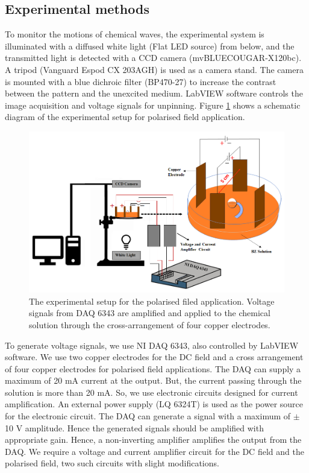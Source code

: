 \documentclass[journal=jacsat,manuscript=article]{achemso}
\begin{document}
\subsection{Experimental methods}
To monitor the motions of chemical waves, the experimental system is
illuminated with a diffused white light (Flat LED source) from below,
and the transmitted light is detected with a CCD camera
(mvBLUECOUGAR-X120bc). A tripod (Vanguard Espod CX 203AGH) is used as
a camera stand. The camera is mounted with a blue dichroic filter
(BP470-27) to increase the contrast between the pattern and the
unexcited medium.  LabVIEW software controls the image acquisition and
voltage signals for unpinning. Figure \ref{fig:ex1} shows a schematic
diagram of the experimental setup for polarised field application.
\begin{figure}[H]
    \centering
    \includegraphics[width=\linewidth]{experiment_setup_01.png}
    \caption{The experimental setup for the polarised filed
      application. Voltage signals from DAQ 6343 are amplified and
      applied to the chemical solution through the cross-arrangement
      of four copper electrodes. }
    \label{fig:ex1}
\end{figure}
To generate voltage signals, we use NI DAQ 6343, also controlled by
LabVIEW software.  We use two copper electrodes for the DC field and a
cross arrangement of four copper electrodes for polarised field
applications. The DAQ can supply a maximum of 20 mA current at the
output. But, the current passing through the solution is more than 20
mA. So, we use electronic circuits designed for current
amplification. An external power supply (LQ 6324T) is used as the
power source for the electronic circuit. The DAQ can generate a signal
with a maximum of $\pm$ 10 V amplitude. Hence the generated signals
should be amplified with appropriate gain. Hence, a non-inverting
amplifier amplifies the output from the DAQ. We require a voltage and
current amplifier circuit for the DC field and the polarised field,
two such circuits with slight modifications.
\end{document}
